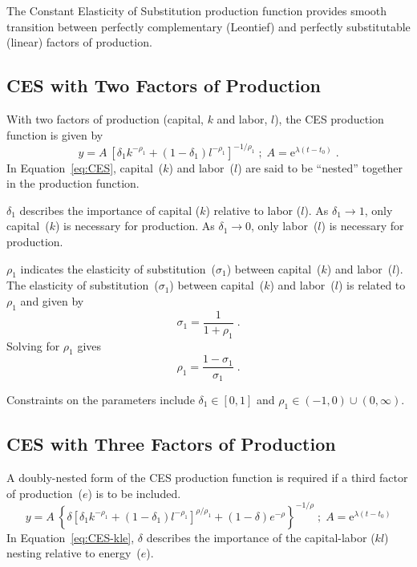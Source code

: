 \documentclass[preprint,authoryear,12pt]{elsarticle}
\begin{document}
The Constant Elasticity of Substitution production function
provides smooth transition between perfectly complementary (Leontief) 
and perfectly substitutable (linear) factors of production.


\subsection{CES with Two Factors of Production} 
\label{sec:CES-2}

With two factors of production (capital, $k$ and labor, $l$), 
the CES production function is given by
%
\begin{equation} \label{eq:CES}
  y = A \: \left[\delta_1 k^{-\rho_1} 
      + (1-\delta_1)l^{-\rho_1} \right]^{-1/\rho_1} \; ; \;
      A = \mathrm{e}^{\lambda (t-t_0)}   \; .
\end{equation}
%
In Equation~\ref{eq:CES}, capital~($k$) and labor~($l$) are said to be ``nested''
together in the production function.

$\delta_1$ describes the importance of capital ($k$)
relative to labor ($l$).
As $\delta_1 \rightarrow 1$, only capital~($k$) is necessary for production.
As $\delta_1 \rightarrow 0$, only labor~($l$) is necessary for production.

$\rho_1$ indicates the elasticity 
of substitution~($\sigma_1$) between capital~($k$) and labor~($l$).
The elasticity of substitution~($\sigma_1$)
between capital~($k$) and labor~($l$) is related to $\rho_1$ and given by 
%
\begin{equation} \label{eq:sigma_1}
 \sigma_1 = \frac{1}{1+\rho_1} \; .
\end{equation}
%
Solving for $\rho_1$ gives
%
\begin{equation} \label{eq:rho_1}
  \rho_1 = \frac{1 - \sigma_1}{\sigma_1} \; .
\end{equation}

Constraints on the parameters include 
$\delta_1 \in [0,1]$ and
$\rho_1 \in (-1,0) \cup (0,\infty)$.



\subsection{CES with Three Factors of Production} 
\label{sec:CES-3}

A doubly-nested form of the CES production function is required
if a third factor of production~($e$) is to be included.
%
\begin{equation} \label{eq:CES-kle}
  y = A \: \left\{\delta \left[\delta_1 k^{-\rho_1} 
      + (1-\delta_1)l^{-\rho_1} \right]^{\rho/\rho_1} 
      + (1-\delta) e^{-\rho} \right\}^{-1/\rho} \; ; \; 
      A = \mathrm{e}^{\lambda (t-t_0)}
\end{equation}
%
In Equation~\ref{eq:CES-kle}, $\delta$ 
describes the importance of the capital-labor ($kl$) nesting 
relative to energy~($e$).
\end{document}
